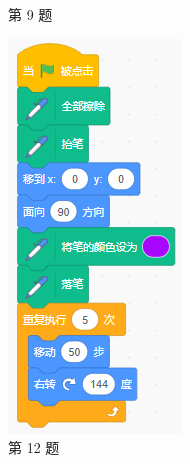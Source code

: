 \documentclass[10pt, a4paper]{article}
\begin{document}
\begin{enumerate}
\begin{figure}[htbp]
\begin{minipage}[t]{.28\textwidth}
                \caption*{第 9 题}
            \end{minipage}
            \begin{minipage}[t]{.12\textwidth}
                \centering
                \includegraphics[width=\textwidth]{12.png}
                \caption*{第 12 题}
            \end{minipage}
        \end{figure}


\end{enumerate}
\end{document}
